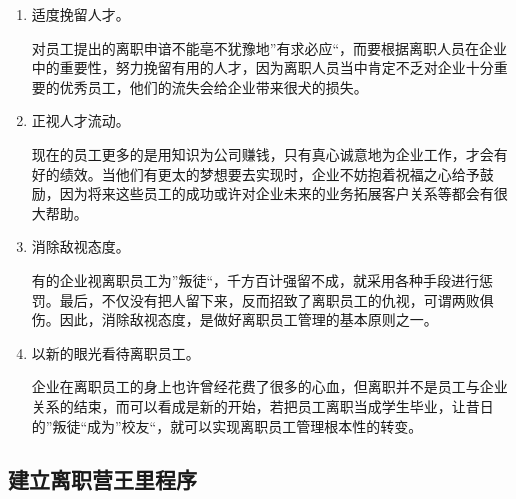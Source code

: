     \begin{enumerate}
        \item 适度挽留人才。

        对员工提出的离职申谙不能亳不犹豫地”有求必应“，而要根据离职人员在企业中的重要性，努力挽留有用的人才，因为离职人员当中肯定不乏对企业十分重要的优秀员工，他们的流失会给企业带来很犬的损失。

        \item 正视人才流动。

        现在的员工更多的是用知识为公司赚钱，只有真心诚意地为企业工作，才会有好的绩效。当他们有更太的梦想要去实现时，企业不妨抱着祝福之心给予鼓励，因为将来这些员工的成功或许对企业未来的业务拓展客户关系等都会有很大帮助。

        \item 消除敌视态度。

        有的企业视离职员工为”叛徒“，千方百计强留不成，就采用各种手段进行惩罚。最后，不仅没有把人留下来，反而招致了离职员工的仇视，可谓两败俱伤。因此，消除敌视态度，是做好离职员工管理的基本原则之一。

        \item 以新的眼光看待离职员工。

        企业在离职员工的身上也许曾经花费了很多的心血，但离职并不是员工与企业关系的结束，而可以看成是新的开始，若把员工离职当成学生毕业，让昔日的”叛徒“成为”校友“，就可以实现离职员工管理根本性的转变。
    \end{enumerate}

\subsection {建立离职营王里程序}

